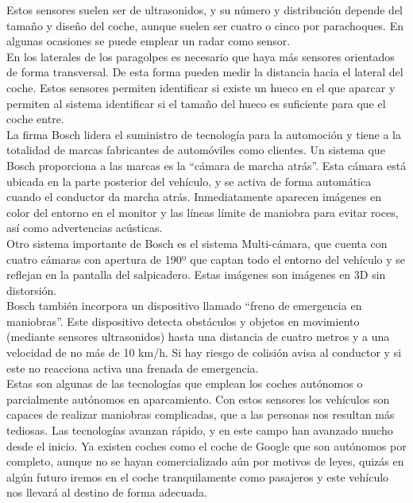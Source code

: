 Estos sensores suelen ser de ultrasonidos, y su número y distribución depende del tamaño y diseño del coche, aunque suelen ser cuatro o cinco por parachoques. En algunas ocasiones se puede emplear un radar como sensor.\\

En los laterales de los paragolpes es necesario que haya más sensores orientados de forma transversal. De esta forma pueden medir la distancia hacia el lateral del coche. Estos sensores permiten identificar si existe un hueco en el que aparcar y permiten al sistema identificar si el tamaño del hueco es suficiente para que el coche entre.\\

La firma Bosch lidera el suministro de tecnología para la automoción y tiene a la totalidad de marcas fabricantes de automóviles como clientes. Un sistema que Bosch proporciona a las marcas es la “cámara de marcha atrás”. Esta cámara está ubicada en la parte posterior del vehículo, y se activa de forma automática cuando el conductor da marcha atrás. Inmediatamente aparecen imágenes en color del entorno en el monitor y las líneas límite de maniobra para evitar roces, así como advertencias acústicas.\\

Otro sistema importante de Bosch es el sistema Multi-cámara, que cuenta con cuatro cámaras con apertura de 190º que captan todo el entorno del vehículo y se reflejan en la pantalla del salpicadero. Estas imágenes son imágenes en 3D sin distorsión.\\

Bosch también incorpora un dispositivo llamado “freno de emergencia en maniobras”. Este dispositivo detecta obstáculos y objetos en movimiento (mediante sensores ultrasonidos) hasta una distancia de cuatro metros y a una velocidad de no más de 10 km/h. Si hay riesgo de colisión avisa al conductor y si este no reacciona activa una frenada de emergencia.\\

Estas son algunas de las tecnologías que emplean los coches autónomos o parcialmente autónomos en aparcamiento. Con estos sensores los vehículos son capaces de realizar maniobras complicadas, que a las personas nos resultan más tediosas. Las tecnologías avanzan rápido, y en este campo han avanzado mucho desde el inicio. Ya existen coches como el coche de Google que son autónomos por completo, aunque no se hayan comercializado aún por motivos de leyes, quizás en algún futuro iremos en el coche tranquilamente como pasajeros y este vehículo nos llevará al destino de forma adecuada.\\

